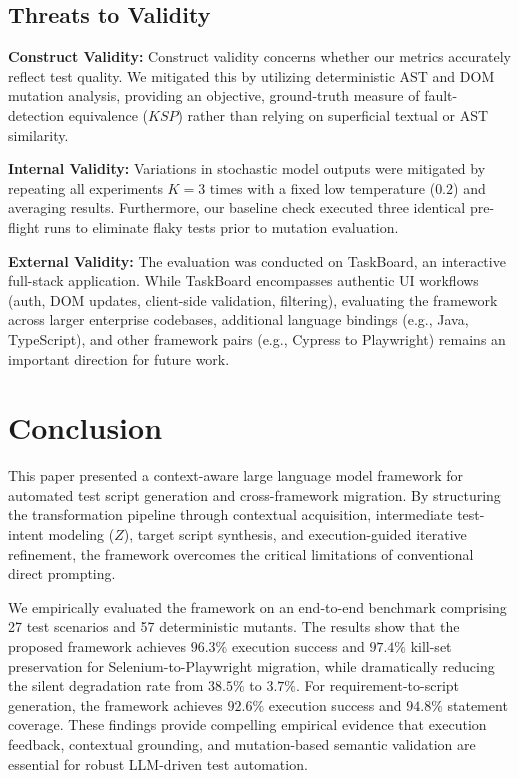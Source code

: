 \documentclass[pdflatex,sn-mathphys-num]{sn-jnl}
\begin{document}
\subsection{Threats to Validity}
\label{sec:threats}

\textbf{Construct Validity:} Construct validity concerns whether our metrics
accurately reflect test quality. We mitigated this by utilizing deterministic AST
and DOM mutation analysis, providing an objective, ground-truth measure of
fault-detection equivalence ($KSP$) rather than relying on superficial textual or
AST similarity.

\textbf{Internal Validity:} Variations in stochastic model outputs were mitigated
by repeating all experiments $K = 3$ times with a fixed low temperature ($0.2$) and
averaging results. Furthermore, our baseline check executed three identical pre-flight
runs to eliminate flaky tests prior to mutation evaluation.

\textbf{External Validity:} The evaluation was conducted on TaskBoard, an interactive
full-stack application. While TaskBoard encompasses authentic UI workflows (auth,
DOM updates, client-side validation, filtering), evaluating the framework across
larger enterprise codebases, additional language bindings (e.g., Java, TypeScript),
and other framework pairs (e.g., Cypress to Playwright) remains an important
direction for future work.


\section{Conclusion}
\label{sec:conclusion}

This paper presented a context-aware large language model framework for automated
test script generation and cross-framework migration. By structuring the transformation
pipeline through contextual acquisition, intermediate test-intent modeling ($Z$),
target script synthesis, and execution-guided iterative refinement, the framework
overcomes the critical limitations of conventional direct prompting.

We empirically evaluated the framework on an end-to-end benchmark comprising 27 test
scenarios and 57 deterministic mutants. The results show that the proposed framework
achieves $96.3\%$ execution success and $97.4\%$ kill-set preservation for
Selenium-to-Playwright migration, while dramatically reducing the silent degradation
rate from $38.5\%$ to $3.7\%$. For requirement-to-script generation, the framework
achieves $92.6\%$ execution success and $94.8\%$ statement coverage. These findings
provide compelling empirical evidence that execution feedback, contextual grounding,
and mutation-based semantic validation are essential for robust LLM-driven test automation.



\end{document}
